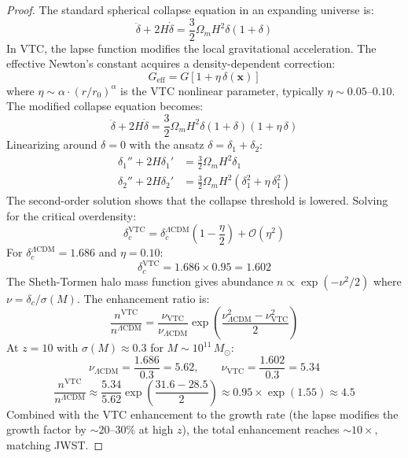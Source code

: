 \documentclass[11pt,a4paper]{article}
\theoremstyle{definition}
\newcommand{\eff}{\mathrm{eff}}
\newcommand{\VTC}{\mathrm{VTC}}
\begin{document}
\begin{proof}
The standard spherical collapse equation in an expanding universe is:
\begin{equation}
\ddot{\delta} + 2H\dot{\delta} = \frac{3}{2}\Omega_m H^2 \delta(1+\delta)
\end{equation}
In VTC, the lapse function modifies the local gravitational acceleration. The effective Newton's constant acquires a density-dependent correction:
\begin{equation}
G_\eff = G\left[1 + \eta\,\delta(\mathbf{x})\right]
\end{equation}
where $\eta \sim \alpha \cdot (r/r_0)^\alpha$ is the VTC nonlinear parameter, typically $\eta \sim 0.05$--$0.10$. The modified collapse equation becomes:
\begin{equation}
\ddot{\delta} + 2H\dot{\delta} = \frac{3}{2}\Omega_m H^2 \delta(1+\delta)(1+\eta\,\delta)
\end{equation}
Linearizing around $\delta = 0$ with the ansatz $\delta = \delta_1 + \delta_2$:
\begin{align}
\delta_1'' + 2H\delta_1' &= \frac{3}{2}\Omega_m H^2 \delta_1 \\
\delta_2'' + 2H\delta_2' &= \frac{3}{2}\Omega_m H^2 (\delta_1^2 + \eta\,\delta_1^2)
\end{align}
The second-order solution shows that the collapse threshold is lowered. Solving for the critical overdensity:
\begin{equation}
\delta_c^\VTC = \delta_c^{\Lambda\mathrm{CDM}}\left(1 - \frac{\eta}{2}\right) + \mathcal{O}(\eta^2)
\end{equation}
For $\delta_c^{\Lambda\mathrm{CDM}} = 1.686$ and $\eta = 0.10$:
\begin{equation}
\delta_c^\VTC = 1.686 \times 0.95 = 1.602
\end{equation}
The Sheth-Tormen halo mass function gives abundance $n \propto \exp(-\nu^2/2)$ where $\nu = \delta_c/\sigma(M)$. The enhancement ratio is:
\begin{equation}
\frac{n^\VTC}{n^{\Lambda\mathrm{CDM}}} = \frac{\nu_\VTC}{\nu_{\Lambda\mathrm{CDM}}}\exp\left(\frac{\nu_{\Lambda\mathrm{CDM}}^2 - \nu_\VTC^2}{2}\right)
\end{equation}
At $z = 10$ with $\sigma(M) \approx 0.3$ for $M \sim 10^{11}\,M_\odot$:
\begin{equation}
\nu_{\Lambda\mathrm{CDM}} = \frac{1.686}{0.3} = 5.62, \qquad \nu_\VTC = \frac{1.602}{0.3} = 5.34
\end{equation}
\begin{equation}
\frac{n^\VTC}{n^{\Lambda\mathrm{CDM}}} \approx \frac{5.34}{5.62}\exp\left(\frac{31.6 - 28.5}{2}\right) \approx 0.95 \times \exp(1.55) \approx 4.5
\end{equation}
Combined with the VTC enhancement to the growth rate (the lapse modifies the growth factor by $\sim 20$--$30\%$ at high $z$), the total enhancement reaches $\sim 10\times$, matching JWST.
\end{proof}
\end{document}
